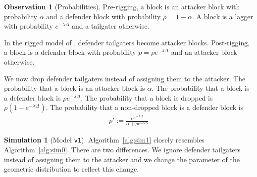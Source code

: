 \documentclass[12pt]{article}
\theoremstyle{definition}
\newtheorem{observation}{Observation}
\newtheorem{simulation}{Simulation}
\begin{document}
\begin{observation}[Probabilities]\label{obs:ptick}
  Pre-rigging, a block is an attacker block with probability $\alpha$ and a defender block with probability $\rho = 1 - \alpha$. A block is a lagger with probability $e^{-\lambda\Delta}$ and a tailgater otherwise.

  In the rigged model of \citet{guo2022BitcoinLatency}, defender tailgaters become attacker blocks.
  Post-rigging, a block is a defender block with probability $p = \rho e^{-\lambda\Delta}$ and an attacker block otherwise.

  We now drop defender tailgaters instead of assigning them to the attacker.
  The probability that a block is an attacker block is $\alpha$.
  The probability that a block is a defender block is $\rho e^{-\lambda\Delta}$.
  The probability that a block is dropped is $\rho (1 - e^{-\lambda\Delta})$.
  The probability that a non-dropped block is a defender block is
  \begin{align}
    p' := \frac{\rho e^{-\lambda\Delta}}{\alpha + \rho e^{-\lambda\Delta}}
  \end{align}
\end{observation}

\begin{simulation}[Model \texttt{v1}] \label{sim:v1}
  Algorithm~\ref{alg:sim1} closely resembles Algorithm~\ref{alg:sim0}.
  There are two differences. We ignore defender tailgaters instead of assigning them to the attacker and we change the parameter of the geometric distribution to reflect this change.
\end{simulation}
\end{document}
